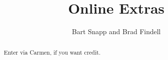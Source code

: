 \documentclass[handout,space,nooutcomes]{xourse}
\title{Online Extras}
\author{Bart Snapp and Brad Findell}
\begin{document}
\begin{abstract}
Enter via Carmen, if you want credit.
\end{abstract}
\maketitle

{}

\end{document}
